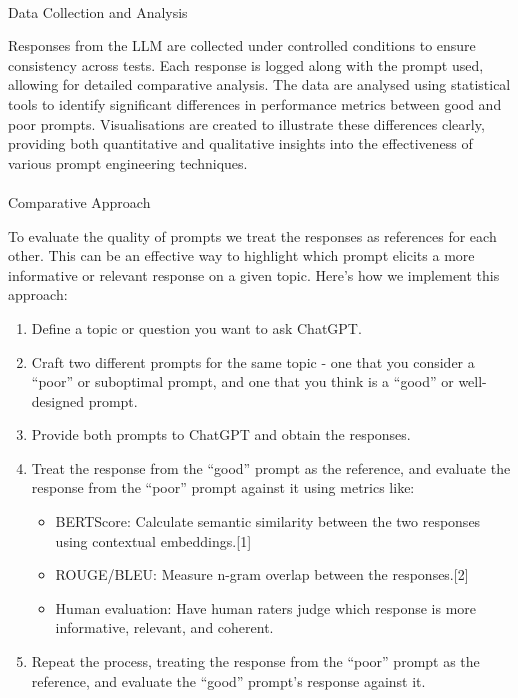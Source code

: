 \documentclass[
]{agujournal2019}
\makeatletter
\let\oldparagraph\paragraph
\renewcommand{\paragraph}{
    \@ifstar
      \xxxParagraphStar
      \xxxParagraphNoStar
  }
\newcommand{\xxxParagraphStar}[1]{\oldparagraph*{#1}\mbox{}}
\newcommand{\xxxParagraphNoStar}[1]{\oldparagraph{#1}\mbox{}}
\providecommand{\tightlist}{%
  \setlength{\itemsep}{0pt}\setlength{\parskip}{0pt}}\usepackage{longtable,booktabs,array}
\makeatother
\begin{document}
\paragraph{Data Collection and
Analysis}\label{data-collection-and-analysis}

Responses from the LLM are collected under controlled conditions to
ensure consistency across tests. Each response is logged along with the
prompt used, allowing for detailed comparative analysis. The data are
analysed using statistical tools to identify significant differences in
performance metrics between good and poor prompts. Visualisations are
created to illustrate these differences clearly, providing both
quantitative and qualitative insights into the effectiveness of various
prompt engineering techniques.

\paragraph{Comparative Approach}\label{comparative-approach}

To evaluate the quality of prompts we treat the responses as references
for each other. This can be an effective way to highlight which prompt
elicits a more informative or relevant response on a given topic. Here's
how we implement this approach:

\begin{enumerate}
\def\labelenumi{\arabic{enumi}.}
\tightlist
\item
  Define a topic or question you want to ask ChatGPT.
\item
  Craft two different prompts for the same topic - one that you consider
  a ``poor'' or suboptimal prompt, and one that you think is a ``good''
  or well-designed prompt.
\item
  Provide both prompts to ChatGPT and obtain the responses.
\item
  Treat the response from the ``good'' prompt as the reference, and
  evaluate the response from the ``poor'' prompt against it using
  metrics like:

  \begin{itemize}
  \tightlist
  \item
    BERTScore: Calculate semantic similarity between the two responses
    using contextual embeddings.{[}1{]}
  \item
    ROUGE/BLEU: Measure n-gram overlap between the responses.{[}2{]}
  \item
    Human evaluation: Have human raters judge which response is more
    informative, relevant, and coherent.
  \end{itemize}
\item
  Repeat the process, treating the response from the ``poor'' prompt as
  the reference, and evaluate the ``good'' prompt's response against it.
\end{enumerate}
\end{document}
